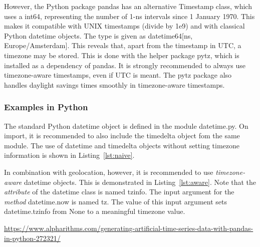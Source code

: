 However, the Python package \textsf{pandas} has an alternative \textsf{Timestamp} class, which uses a \textsf{int64}, representing the number of 1-ns intervals since 1 January 1970. This makes it compatible with UNIX timestamps (divide by 1e9) and with classical Python datetime objects. The type is given as \textsf{datetime64[ns, Europe/Amsterdam]}. This reveals that, apart from the timestamp in UTC, a timezone may be stored. This is done with the helper package \textsf{pytz}, which is installed as a dependency of \textsf{pandas}. It is strongly recommended to always use timezone-aware timestamps, even if UTC is meant. The pytz package also handles daylight savings times smoothly in timezone-aware timestamps.

\subsubsection{Examples in Python}

The standard Python \textsf{datetime} object is defined in the module \textsf{datetime.py}. On import, it is recommended to also include the \textsf{timedelta} object fom the same module. The use of \textsf{datetime} and \textsf{timedelta} objects without setting timezone information is shown in Listing~\ref*{lst:naive}.

%

In combination with geolocation, however, it is recommended to use \emph{timezone-aware} \textsf{datetime} objects. This is demonstrated in Listing~\ref*{lst:aware}. Note that the \emph{attribute} of the \textsf{datetime} class is named \textsf{tzinfo}. The input argument for the \emph{method} \textsf{datetime.now} is named \textsf{tz}. The value of this input argument sets \textsf{datetime.tzinfo} from \textsf{None} to a meaningful \textsf{timezone} value.

%

%

\url{https://www.alpharithms.com/generating-artificial-time-series-data-with-pandas-in-python-272321/}

